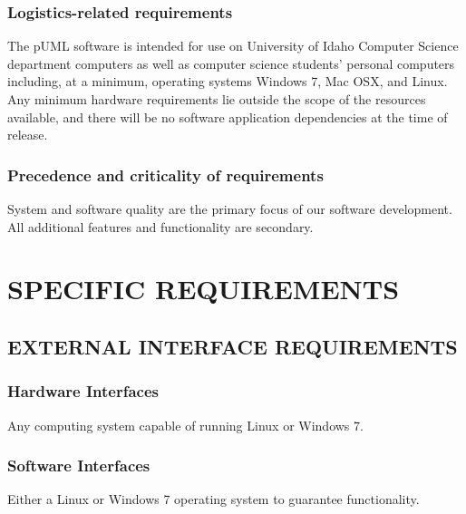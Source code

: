 \documentclass[twoside,letterpaper]{article}
\begin{document}
\subsubsection[Logistics{}-related requirements]{\rmfamily\bfseries
Logistics-related requirements}
{
The pUML software is intended for use on University of Idaho Computer Science department computers as well as computer science students' personal computers including, at a minimum, operating systems Windows 7, Mac OSX, and Linux.
Any minimum hardware requirements lie outside the scope of the resources available,
and there will be no software application dependencies at the time of release.
}

\subsubsection[Precedence and criticality of requirements]{\rmfamily\bfseries
Precedence and criticality of requirements}
{
System and software quality are the primary focus of our software development. All additional features and functionality are secondary. 
}












\clearpage\section[SPECIFIC REQUIREMENTS]{\rmfamily\bfseries
SPECIFIC REQUIREMENTS}

\subsection[EXTERNAL INTERFACE REQUIREMENTS]{\rmfamily\bfseries
EXTERNAL INTERFACE REQUIREMENTS}

\subsubsection[Hardware Interfaces]{\rmfamily\bfseries
Hardware Interfaces}
{

{
Any computing system capable of running Linux or Windows 7.}}

\subsubsection[Software Interfaces]{\rmfamily\bfseries
Software Interfaces}
{ 
{
Either a Linux or Windows 7 operating system to guarantee functionality.
}}
\end{document}
